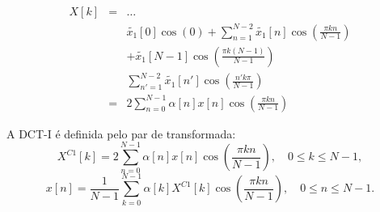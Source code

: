 \begin{frame}[allowframebreaks]
  \begin{eqnarray}
  X[k] &=& \ldots \nonumber \\ 
        && \tilde{x_1}[0] \cos(0) + \sum_{n=1}^{N-2} \tilde{x_1}[n] \cos\left( \frac{\pi k n}{N-1} \right)  \\
        && + \tilde{x_1}[N-1] \cos\left( \frac{\pi k (N-1)}{N-1} \right) \nonumber \\
        && \sum_{n'=1}^{N-2} \tilde{x_1}[n'] \cos\left( \frac{n' k \pi}{N-1} \right) \\
        &=& 2 \sum_{n=0}^{N-1} \alpha[n] x[n] \cos \left( \frac{\pi k n}{N - 1} \right)
  \end{eqnarray}

  \framebreak

  A DCT-I é definida pelo par de transformada:
  \begin{equation}
  X^{C1}[k] = 2 \sum_{n=0}^{N-1} \alpha[n] x[n] \cos \left( \frac{\pi k n}{N - 1} \right) , \quad 0 \leq k \leq N-1 ,
  \end{equation}
  \begin{equation}
  x[n] = \frac{1}{N-1} \sum_{k=0}^{N-1} \alpha[k] X^{C1}[k] \cos \left( \frac{\pi k n}{N - 1} \right) , \quad 0 \leq n \leq N-1.
  \end{equation}
\end{frame}



